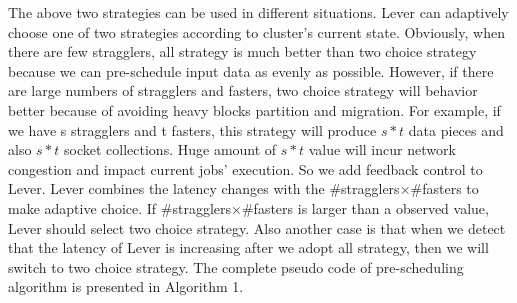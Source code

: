 \documentclass[10pt,conference,compsocconf,letterpaper]{IEEEtran}
\begin{document}
  The above two strategies can be used in different situations. Lever can adaptively choose one of two strategies according to cluster's current state. Obviously, when there are few stragglers, all strategy is much better than two choice strategy because we can pre-schedule input data as evenly as possible. However, if there are large numbers of stragglers and fasters, two choice strategy will behavior better because of avoiding heavy blocks partition and migration. For example, if we have s stragglers and t fasters, this strategy will produce $s*t$ data pieces and also $s*t$ socket collections. Huge amount of $s*t$ value will incur network congestion and impact current jobs' execution. So we add feedback control to Lever.
  Lever combines the latency changes with the \#stragglers$\times$\#fasters to make adaptive choice. If \#stragglers$\times$\#fasters is larger than a observed value, Lever should select two choice strategy. Also another case is that when we detect that the latency of Lever is increasing after we adopt all strategy, then we will switch to two choice strategy. The complete pseudo code of pre-scheduling algorithm is presented in Algorithm 1.
\end{document}

